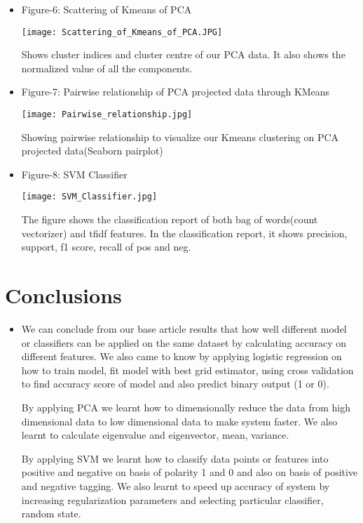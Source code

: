 \documentclass{article}
\begin{document}
\begin{itemize}
    \item  Figure-6: Scattering of Kmeans of PCA
    \begin{center}
         \texttt{[image: Scattering\_of\_Kmeans\_of\_PCA.JPG]}
    \end{center}
     Shows cluster indices and cluster centre of our PCA data. It also shows the normalized value of all the components.
    
    \item  Figure-7: Pairwise relationship of PCA projected data through KMeans
    \begin{center}
         \texttt{[image: Pairwise\_relationship.jpg]}
    \end{center}
     Showing pairwise relationship to visualize our Kmeans clustering on PCA projected data(Seaborn pairplot)
    
    \item  Figure-8: SVM Classifier
    \begin{center}
         \texttt{[image: SVM\_Classifier.jpg]}
    \end{center}
    The figure shows the classification report of both bag of words(count vectorizer) and tfidf features. In the classification report, it shows precision, support, f1 score, recall of pos and neg.
\end{itemize}

\section{Conclusions}
\begin{itemize}
	\item We can conclude from our base article results that how well different model or classifiers can be applied on the same dataset by calculating accuracy on different features. We also came to know by applying logistic regression on  how to train model, fit model with best  grid estimator, using cross validation to find accuracy score of model and also predict binary output (1 or 0). 
 
    By applying PCA we learnt how to dimensionally reduce the data  from high dimensional data to low dimensional data  to make system faster. We also learnt to calculate  eigenvalue and eigenvector, mean, variance. 

    By applying SVM we learnt how to classify data points or features into positive and negative on basis of polarity 1 and 0 and also on basis of positive and negative tagging. We also learnt to speed up accuracy of system by increasing regularization parameters and  selecting particular classifier, random state.
\end{itemize} 
\end{document}
